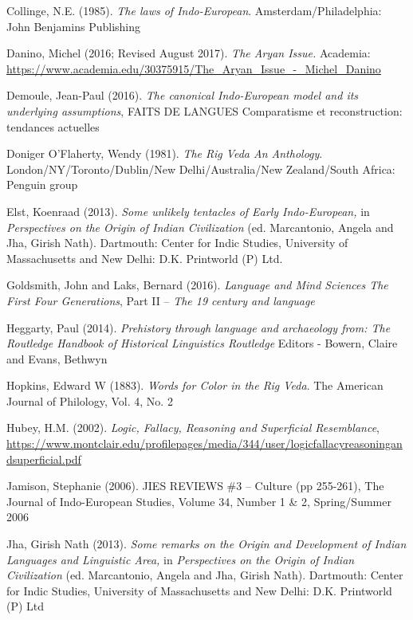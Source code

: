 \begin{thebibliography}{99}
  Collinge, N.E. (1985). \textit{The laws of Indo-European}. Amsterdam/Philadelphia: John Benjamins Publishing

  Danino, Michel (2016; Revised August 2017). \textit{The Aryan Issue.} Academia: \url{https://www.academia.edu/30375915/The_Aryan_Issue_-_Michel_Danino}

  Demoule, Jean-Paul (2016). \textit{The canonical Indo-European model and its underlying assumptions}, FAITS DE LANGUES Comparatisme et reconstruction: tendances actuelles

  Doniger O’Flaherty, Wendy (1981). \textit{The Rig Veda An Anthology}. London/NY/Toronto/Dublin/New Delhi/Australia/New Zealand/South Africa: Penguin group

  Elst, Koenraad (2013). \textit{Some unlikely tentacles of Early Indo-European, }in \textit{Perspectives on the Origin of Indian Civilization }(ed. Marcantonio, Angela and Jha, Girish Nath). Dartmouth: Center for Indic Studies, University of Massachusetts and New Delhi: D.K. Printworld (P) Ltd.

  Goldsmith, John and Laks, Bernard (2016). \textit{Language and Mind Sciences The First Four Generations}, Part II – \textit{The 19 century and language}

  Heggarty, Paul (2014). \textit{Prehistory through language and archaeology from: The Routledge Handbook of Historical Linguistics Routledge} Editors - Bowern, Claire and Evans, Bethwyn 

  Hopkins, Edward W (1883). \textit{Words for Color in the Rig Veda}. The American Journal of Philology, Vol. 4, No. 2

  Hubey, H.M. (2002). \textit{Logic, Fallacy, Reasoning and Superficial Resemblance}, \url{https://www.montclair.edu/profilepages/media/344/user/logicfallacyreasoningandsuperficial.pdf}

  Jamison, Stephanie (2006). JIES REVIEWS \#3 – Culture (pp 255-261), The Journal of Indo-European Studies, Volume 34, Number 1 \& 2, Spring/Summer 2006

  Jha, Girish Nath (2013). \textit{Some remarks on the Origin and Development of Indian Languages and Linguistic Area,} in \textit{Perspectives on the Origin of Indian Civilization} (ed. Marcantonio, Angela and Jha, Girish Nath). Dartmouth: Center for Indic Studies, University of Massachusetts and New Delhi: D.K. Printworld (P) Ltd


\end{thebibliography}
